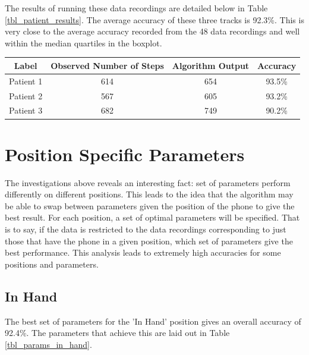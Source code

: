            The results of running these data recordings are detailed below in Table \ref{tbl_patient_results}. The average accuracy of these three tracks is 92.3\%. This is very close to the average accuracy recorded from the 48 data recordings and well within the median quartiles in the boxplot.

            \begin{center}
                \label{tbl_patient_results}
                \begin{tabular}{|c|c|c|c|}
                    \hline
                    Label & Observed Number of Steps & Algorithm Output & Accuracy \\
                    \hline
                    Patient 1 & 614 & 654 & 93.5\% \\ 
                    Patient 2 & 567 & 605 & 93.2\% \\
                    Patient 3 & 682 & 749 & 90.2\% \\
                    \hline
                \end{tabular}
            \end{center}

        \section{Position Specific Parameters}

            The investigations above reveals an interesting fact: set of parameters perform differently on different positions. This leads to the idea that the algorithm may be able to swap between parameters given the position of the phone to give the best result. For each position, a set of optimal parameters will be specified. That is to say, if the data is restricted to the data recordings corresponding to just those that have the phone in a given position, which set of parameters give the best performance. This analysis leads to extremely high accuracies for some positions and parameters.

            \subsection{In Hand}

                The best set of parameters for the 'In Hand' position gives an overall accuracy of 92.4\%. The parameters that achieve this are laid out in Table \ref{tbl_params_in_hand}.

